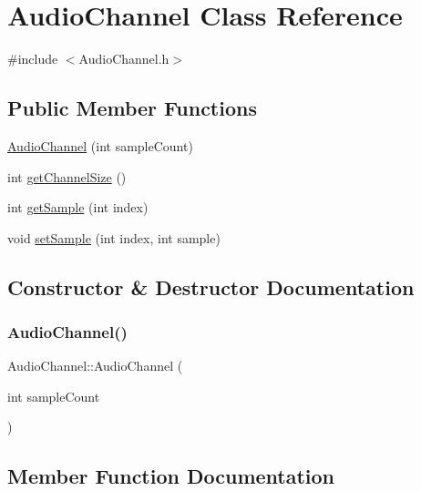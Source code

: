 \hypertarget{class_audio_channel}{}\section{Audio\+Channel Class Reference}
\label{class_audio_channel}


{\ttfamily \#include $<$Audio\+Channel.\+h$>$}

\subsection*{Public Member Functions}
\begin{DoxyCompactItemize}
\item 
\hyperlink{class_audio_channel_a8ee2481871236bab12f567830fc8361b}{Audio\+Channel} (int sample\+Count)
\item 
int \hyperlink{class_audio_channel_aadd79d20c09baad7317d7c10aab90ebb}{get\+Channel\+Size} ()
\item 
int \hyperlink{class_audio_channel_aa63fe5d11906c24b150f3d6b5473c913}{get\+Sample} (int index)
\item 
void \hyperlink{class_audio_channel_a477b5173b05f969385802295bb479ed4}{set\+Sample} (int index, int sample)
\end{DoxyCompactItemize}


\subsection{Constructor \& Destructor Documentation}
\mbox{\label{class_audio_channel_a8ee2481871236bab12f567830fc8361b}} 
\subsubsection{\texorpdfstring{Audio\+Channel()}{AudioChannel()}}
{\footnotesize\ttfamily Audio\+Channel\+::\+Audio\+Channel (\begin{DoxyParamCaption}\item[{int}]{sample\+Count }\end{DoxyParamCaption})\hspace{0.3cm}{\ttfamily [inline]}}



\subsection{Member Function Documentation}
\mbox{\label{class_audio_channel_aadd79d20c09baad7317d7c10aab90ebb}} 

